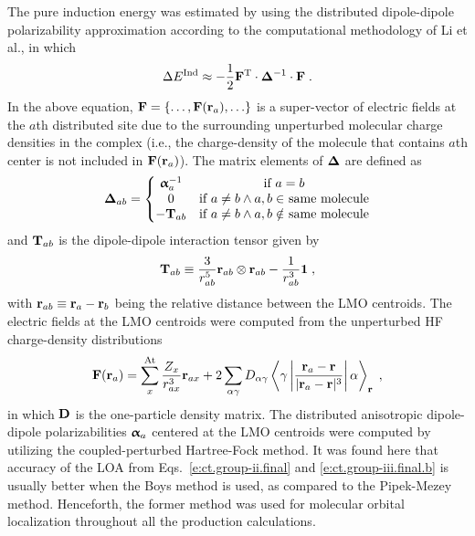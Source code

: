 The pure induction energy was estimated by using the distributed
dipole\hyp{}dipole polarizability approximation according to the computational
methodology of Li et al.,\cite{Li.Netzloff.Gordon.JCP.2006}
in which
%
\begin{equation}\label{e:ind-ref}
 \Delta E^{\rm Ind} \approx - \frac{1}{2} {\bf F}^{\rm T} \cdot {\bm{\Delta}}^{-1} \cdot {\bf F} \;.
\end{equation}
%
In the above equation, ${\bf F} = \{ \ldots, {\bf F}({\bf r}_a), \ldots\}$
is a super\hyp{}vector of electric fields at the $a$th distributed site
due to the surrounding unperturbed molecular charge densities in the complex
(i.e., the charge\hyp{}density of the molecule that contains $a$th center
is not included in ${\bf F}({\bf r}_a)$).
The matrix elements of ${\bm{\Delta}}$ are defined as
%
\begin{equation} \label{e:ind-ref.d-matrix}
 {\bm{\Delta}}_{ab} = 
\left\{\begin{matrix}
{\bm{\upalpha}}_a^{-1} &\text{if $a=b$} \\ 
0                    &\text{if $a\ne b \land a,b \in$ same molecule}\\ 
-{\bf T}_{ab}        &\text{if $a\ne b \land a,b \notin$ same molecule}
\end{matrix}\right.
\end{equation}
%
and ${\bf T}_{ab}$ is the dipole\hyp{}dipole interaction tensor
given by
%
\begin{equation} \label{e:ind-ref.t-matrix}
 {\bf T}_{ab} \equiv \frac{3}{r_{ab}^5} {\bf r}_{ab} \otimes {\bf r}_{ab}
  - \frac{1}{r_{ab}^3} {\bf 1} \;,
\end{equation}
%
with ${\bf r}_{ab} \equiv {\bf r}_{a} - {\bf r}_{b}$ being the
relative distance between the LMO centroids.
The electric fields at the LMO centroids were computed from
the unperturbed HF charge\hyp{}density distributions
%
\begin{equation} \label{e:ind-ref.efield}
 {\bf F}({\bf r}_a) = \sum_x^{\rm At} \frac{Z_x}{r_{ax}^3} {\bf r}_{ax} 
  + 2 \sum_{\alpha\gamma} D_{\alpha\gamma} 
  \left< \gamma \left| 
    \frac{{\bf r}_a - {\bf r}}{\vert {\bf r}_a - {\bf r} \vert^3}
               \right| \alpha \right>_{\bf r} \;,
\end{equation}
%
in which ${\bf D}$ is the one\hyp{}particle density matrix.
The distributed anisotropic dipole\hyp{}dipole
polarizabilities ${\bm{\upalpha}}_a$ centered at the LMO centroids
were computed by utilizing the coupled\hyp{}perturbed Hartree\hyp{}Fock
method.\cite{McWeeny.RevModPhys.1960,Dodds.McWeeney.Sadlej.MolPhys.1977} 
It was found here that accuracy of the LOA 
from Eqs.~\eqref{e:ct.group-ii.final} and \eqref{e:ct.group-iii.final.b}
is usually better 
when the Boys method\cite{Boys.RevModPhys.1960} is used, as compared
to the Pipek\hyp{}Mezey method\cite{Pipek.Mezey.JCP.1989}. Henceforth, the former
method was used for molecular orbital localization throughout all the production calculations.

